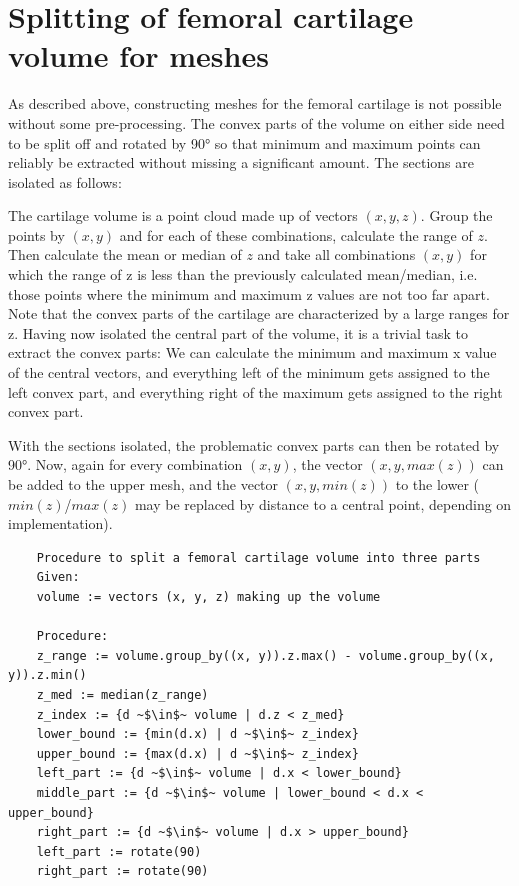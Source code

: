 \section{Splitting of femoral cartilage volume for meshes}
\label{sec:Splitting}
As described above, constructing meshes for the femoral cartilage is not possible without some pre-processing. The convex parts of the volume on either side need to be split off and rotated by 90° so that minimum and maximum points can reliably be extracted without missing a significant amount. The sections are isolated as follows: 
\par\noindent
The cartilage volume is a point cloud made up of vectors $(x, y, z)$. Group the points by $(x, y)$ and for each of these combinations, calculate the range of $z$. Then calculate the mean or median of $z$ and take all combinations $(x, y)$ for which the range of z is less than the previously calculated mean/median, i.e. those points where the minimum and maximum z values are not too far apart. Note that the convex parts of the cartilage are characterized by a large ranges for z. Having now isolated the central part of the volume, it is a trivial task to extract the convex parts: We can calculate the minimum and maximum x value of the central vectors, and everything left of the minimum gets assigned to the left convex part, and everything right of the maximum gets assigned to the right convex part.
\par\noindent
With the sections isolated, the problematic convex parts can then be rotated by 90°. Now, again for every combination $(x, y)$, the vector $(x, y, max(z))$ can be added to the upper mesh, and the vector $(x, y, min(z))$ to the lower ($min(z)$/$max(z)$ may be replaced by distance to a central point, depending on implementation).

\begin{verbatim}
	Procedure to split a femoral cartilage volume into three parts
	Given:
	volume := vectors (x, y, z) making up the volume
	
	Procedure:
	z_range := volume.group_by((x, y)).z.max() - volume.group_by((x, y)).z.min()
	z_med := median(z_range)
	z_index := {d ~$\in$~ volume | d.z < z_med}
	lower_bound := {min(d.x) | d ~$\in$~ z_index}
	upper_bound := {max(d.x) | d ~$\in$~ z_index}
	left_part := {d ~$\in$~ volume | d.x < lower_bound}
	middle_part := {d ~$\in$~ volume | lower_bound < d.x < upper_bound}
	right_part := {d ~$\in$~ volume | d.x > upper_bound}
	left_part := rotate(90)
	right_part := rotate(90)
\end{verbatim} 

